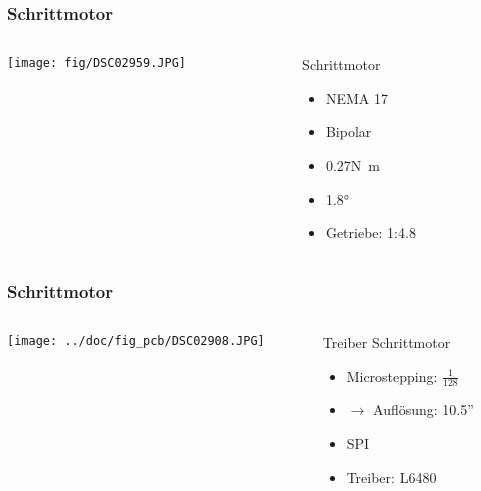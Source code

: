 \begin{frame}
    \frametitle{Schrittmotor}
    \begin{columns}
        \begin{column}{0.50\textwidth}
            \centering
            \texttt{[image: fig/DSC02959.JPG]}
        \end{column}
        \begin{column}{0.50\textwidth}
            \begin{block}{Schrittmotor}
                \begin{itemize}
                    \item NEMA 17
                    \item Bipolar
                    \item 0.27\si{\newton\metre}
                    \item 1.8\si{\degree}
                    \item Getriebe: 1:4.8
                \end{itemize}
            \end{block}
        \end{column}
    \end{columns}
\end{frame}
\begin{frame}
    \frametitle{Schrittmotor}
    \begin{columns}
        \begin{column}{0.50\textwidth}
            \centering
            \texttt{[image: ../doc/fig\_pcb/DSC02908.JPG]}
        \end{column}
        \begin{column}{0.50\textwidth}
            \begin{block}{Treiber Schrittmotor}
                \begin{itemize}
                    \item Microstepping: $\frac{1}{128}$
                    \item $\to$ Auflösung: 10.5''
                    \item SPI
                    \item Treiber: L6480
                \end{itemize}
            \end{block}
        \end{column}
    \end{columns}
\end{frame}

